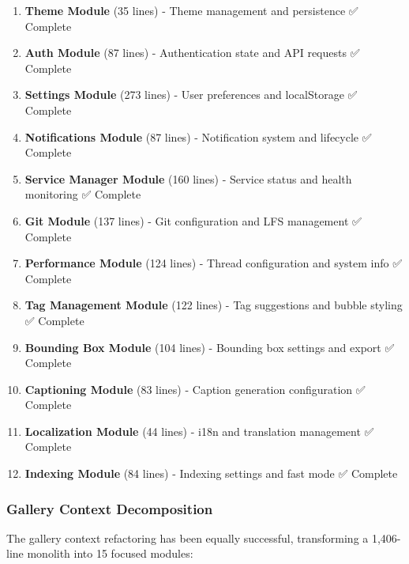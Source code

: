 \documentclass[11pt]{article}
\begin{document}
\begin{enumerate}
\item \textbf{Theme Module} (35 lines) - Theme management and persistence ✅ Complete
\item \textbf{Auth Module} (87 lines) - Authentication state and API requests ✅ Complete
\item \textbf{Settings Module} (273 lines) - User preferences and localStorage ✅ Complete
\item \textbf{Notifications Module} (87 lines) - Notification system and lifecycle ✅ Complete
\item \textbf{Service Manager Module} (160 lines) - Service status and health monitoring ✅ Complete
\item \textbf{Git Module} (137 lines) - Git configuration and LFS management ✅ Complete
\item \textbf{Performance Module} (124 lines) - Thread configuration and system info ✅ Complete
\item \textbf{Tag Management Module} (122 lines) - Tag suggestions and bubble styling ✅ Complete
\item \textbf{Bounding Box Module} (104 lines) - Bounding box settings and export ✅ Complete
\item \textbf{Captioning Module} (83 lines) - Caption generation configuration ✅ Complete
\item \textbf{Localization Module} (44 lines) - i18n and translation management ✅ Complete
\item \textbf{Indexing Module} (84 lines) - Indexing settings and fast mode ✅ Complete
\end{enumerate}

\subsubsection{Gallery Context Decomposition}

The gallery context refactoring has been equally successful, transforming a 1,406-line monolith into 15 focused modules:
\end{document}
